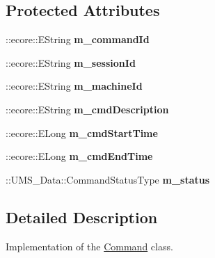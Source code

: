 \subsection*{Protected Attributes}
\begin{DoxyCompactItemize}
\item 
\hypertarget{classUMS__Data_1_1Command_a0b39d38fccda982161bdb4cb2d4a1e33}{
::ecore::EString {\bfseries m\_\-commandId}}
\label{classUMS__Data_1_1Command_a0b39d38fccda982161bdb4cb2d4a1e33}

\item 
\hypertarget{classUMS__Data_1_1Command_a228ce9dd2288d6b74a6d51af34c6d80f}{
::ecore::EString {\bfseries m\_\-sessionId}}
\label{classUMS__Data_1_1Command_a228ce9dd2288d6b74a6d51af34c6d80f}

\item 
\hypertarget{classUMS__Data_1_1Command_aaa757a4f68a55b49a622087fbf5dc8be}{
::ecore::EString {\bfseries m\_\-machineId}}
\label{classUMS__Data_1_1Command_aaa757a4f68a55b49a622087fbf5dc8be}

\item 
\hypertarget{classUMS__Data_1_1Command_a7aad32f9355d0b778107f19d2cf2fc99}{
::ecore::EString {\bfseries m\_\-cmdDescription}}
\label{classUMS__Data_1_1Command_a7aad32f9355d0b778107f19d2cf2fc99}

\item 
\hypertarget{classUMS__Data_1_1Command_a83d110336336532e3dfca161c8800878}{
::ecore::ELong {\bfseries m\_\-cmdStartTime}}
\label{classUMS__Data_1_1Command_a83d110336336532e3dfca161c8800878}

\item 
\hypertarget{classUMS__Data_1_1Command_ac7a1a49d616927212d67747e62e1bd99}{
::ecore::ELong {\bfseries m\_\-cmdEndTime}}
\label{classUMS__Data_1_1Command_ac7a1a49d616927212d67747e62e1bd99}

\item 
\hypertarget{classUMS__Data_1_1Command_a8525fe54dca6ed9a7b1eaed13bde09ef}{
::UMS\_\-Data::CommandStatusType {\bfseries m\_\-status}}
\label{classUMS__Data_1_1Command_a8525fe54dca6ed9a7b1eaed13bde09ef}

\end{DoxyCompactItemize}


\subsection{Detailed Description}
Implementation of the \hyperlink{classUMS__Data_1_1Command}{Command} class. 

